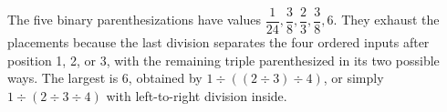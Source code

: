 The five binary parenthesizations have values $\dfrac{1}{24},\dfrac{3}{8},\dfrac{2}{3},\dfrac{3}{8},6 $. They exhaust the placements because the last division separates the four ordered inputs after position 1, 2, or 3, with the remaining triple parenthesized in its two possible ways. The largest is $\boxed6 $, obtained by $ 1\div((2\div3)\div4)$, or simply $ 1\div(2\div3\div4)$ with left-to-right division inside.
